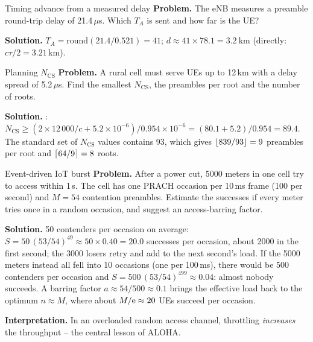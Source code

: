 \documentclass[11pt,a4paper]{article}
\begin{document}
\begin{examplebox}{Timing advance from a measured delay}\label{ex:ta}
\textbf{Problem.} The eNB measures a preamble round-trip delay of 21.4\,$\mu$s. Which $T_A$ is sent and how
far is the UE?

\textbf{Solution.} $T_A = \mathrm{round}(21.4/0.521) = 41$; $d \approx 41\times78.1 = \qty{3.2}{\kilo\metre}$
(directly: $c\tau/2 = 3.21$\,km).
\end{examplebox}

\begin{examplebox}{Planning $N_{\mathrm{CS}}$}\label{ex:ncs}
\textbf{Problem.} A rural cell must serve UEs up to 12\,km with a delay spread of 5.2\,$\mu$s. Find the
smallest $N_{\mathrm{CS}}$, the preambles per root and the number of roots.

\textbf{Solution.} : $N_{\mathrm{CS}} \ge (2\times12\,000/c + 5.2\times10^{-6})/0.954\times10^{-6} =
(80.1+5.2)/0.954 = 89.4$. The standard set of $N_{\mathrm{CS}}$ values contains 93, which gives
$\left\lfloor 839/93\right\rfloor = 9$ preambles per root and $\left\lceil 64/9\right\rceil = 8$ roots.
\end{examplebox}

\begin{examplebox}{Event-driven IoT burst}\label{ex:burst}
\textbf{Problem.} After a power cut, 5000 meters in one cell try to access within 1\,s. The cell has one PRACH
occasion per 10\,ms frame (100 per second) and $M = 54$ contention preambles. Estimate the successes if every
meter tries once in a random occasion, and suggest an access-barring factor.

\textbf{Solution.} 50 contenders per occasion on average: $S = 50\,(53/54)^{49} \approx 50\times0.40 = 20.0$
successes per occasion, about 2000 in the first second; the 3000 losers retry and add to the next second's
load. If the 5000 meters instead all fell into 10 occasions (one per 100\,ms), there would be 500 contenders
per occasion and $S = 500\,(53/54)^{499}\approx 0.04$: almost nobody succeeds. A barring factor
$a\approx 54/500\approx0.1$ brings the effective load back to the optimum $n\approx M$, where about $M/\mathrm{e}\approx20$
UEs succeed per occasion.

\textbf{Interpretation.} In an overloaded random access channel, throttling \emph{increases} the throughput --
the central lesson of ALOHA.
\end{examplebox}

\end{document}
